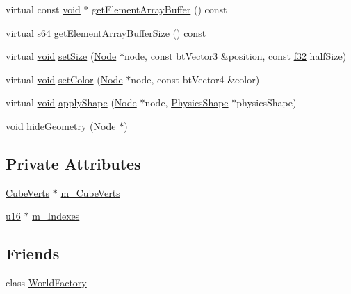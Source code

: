 \begin{DoxyCompactItemize}
\item 
virtual const \mbox{\hyperlink{_thread_8h_af1e856da2e658414cb2456cb6f7ebc66}{void}} $\ast$ \mbox{\hyperlink{classnjli_1_1_cube_a23d0d7188f82ae0b16d79a809b4656ea}{get\+Element\+Array\+Buffer}} () const
\item 
virtual \mbox{\hyperlink{_util_8h_a4258bfb2c3a440d06c4aaa3c2b450dde}{s64}} \mbox{\hyperlink{classnjli_1_1_cube_abf93b9573c3ef1b94809e50774a06379}{get\+Element\+Array\+Buffer\+Size}} () const
\item 
virtual \mbox{\hyperlink{_thread_8h_af1e856da2e658414cb2456cb6f7ebc66}{void}} \mbox{\hyperlink{classnjli_1_1_cube_a935f8c1119991d17858a3982c33912b6}{set\+Size}} (\mbox{\hyperlink{classnjli_1_1_node}{Node}} $\ast$node, const bt\+Vector3 \&position, const \mbox{\hyperlink{_util_8h_a5f6906312a689f27d70e9d086649d3fd}{f32}} half\+Size)
\item 
virtual \mbox{\hyperlink{_thread_8h_af1e856da2e658414cb2456cb6f7ebc66}{void}} \mbox{\hyperlink{classnjli_1_1_cube_aa07b851ff55bd189771d467ca94be5fa}{set\+Color}} (\mbox{\hyperlink{classnjli_1_1_node}{Node}} $\ast$node, const bt\+Vector4 \&color)
\item 
virtual \mbox{\hyperlink{_thread_8h_af1e856da2e658414cb2456cb6f7ebc66}{void}} \mbox{\hyperlink{classnjli_1_1_cube_ac3cffa5a972b0925f562fcabab368cd2}{apply\+Shape}} (\mbox{\hyperlink{classnjli_1_1_node}{Node}} $\ast$node, \mbox{\hyperlink{classnjli_1_1_physics_shape}{Physics\+Shape}} $\ast$physics\+Shape)
\item 
\mbox{\hyperlink{_thread_8h_af1e856da2e658414cb2456cb6f7ebc66}{void}} \mbox{\hyperlink{classnjli_1_1_cube_a328e8add9f2af823067d7c98e33dcff2}{hide\+Geometry}} (\mbox{\hyperlink{classnjli_1_1_node}{Node}} $\ast$)
\end{DoxyCompactItemize}
\subsection*{Private Attributes}
\begin{DoxyCompactItemize}
\item 
\mbox{\hyperlink{structnjli_1_1_cube_1_1_cube_verts}{Cube\+Verts}} $\ast$ \mbox{\hyperlink{classnjli_1_1_cube_aef7ffe6a03c42b84dea87cda97e625f4}{m\+\_\+\+Cube\+Verts}}
\item 
\mbox{\hyperlink{_util_8h_a9e6c91d77e24643b888dbd1a1a590054}{u16}} $\ast$ \mbox{\hyperlink{classnjli_1_1_cube_a6570ae7288027e012bb99028132debd2}{m\+\_\+\+Indexes}}
\end{DoxyCompactItemize}
\subsection*{Friends}
\begin{DoxyCompactItemize}
\item 
class \mbox{\hyperlink{classnjli_1_1_cube_acb96ebb09abe8f2a37a915a842babfac}{World\+Factory}}
\end{DoxyCompactItemize}


